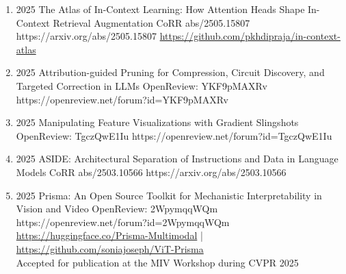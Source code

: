{\begin{enumerate}
             
        \item {}
                        {2025}
                        {The Atlas of In-Context Learning: How Attention Heads Shape In-Context Retrieval Augmentation}
                        {CoRR abs/2505.15807}
                        {https://arxiv.org/abs/2505.15807}
                        {
                            \href{https://github.com/pkhdipraja/in-context-atlas}{https://github.com/pkhdipraja/in-context-atlas}
                        }
                        
                        
        \item {}
                        {2025}
                        {Attribution-guided Pruning for Compression, Circuit Discovery, and Targeted Correction in LLMs}
                        {OpenReview: YKF9pMAXRv}
                        {https://openreview.net/forum?id=YKF9pMAXRv}    
                        
                        
    
        \item {}
                        {2025}
                        {Manipulating Feature Visualizations with Gradient Slingshots}
                        {OpenReview: TgczQwE1Iu}
                        {https://openreview.net/forum?id=TgczQwE1Iu}    
    
    
        \item {}
                        {2025}
                        {ASIDE: Architectural Separation of Instructions and Data in Language Models}
                        {CoRR abs/2503.10566}
                        {https://arxiv.org/abs/2503.10566}    

                        
        \item {}
                        {2025}
                        {Prisma: An Open Source Toolkit for Mechanistic Interpretability in Vision and Video}
                        {OpenReview: 2WpymqqWQm}
                        {https://openreview.net/forum?id=2WpymqqWQm}
                        {
                            \\\href{https://huggingface.co/Prisma-Multimodal}{https://huggingface.co/Prisma-Multimodal} | \href{https://github.com/soniajoseph/ViT-Prisma}{https://github.com/soniajoseph/ViT-Prisma}
                            \\ Accepted for publication at the MIV Workshop during CVPR 2025
                        }


\end{enumerate}}
